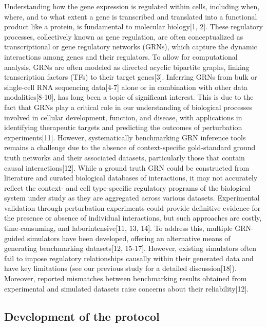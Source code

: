 Understanding how the gene expression is regulated within cells, including when, where, and to what extent a gene is transcribed and translated into a functional product like a protein, is fundamental to molecular biology[1, 2]. These regulatory processes, collectively known as gene regulation, are often conceptualized as transcriptional or gene regulatory networks (GRNs),
which capture the dynamic interactions among genes and their regulators. To allow for computational analysis, GRNs are often modeled as directed acyclic bipartite graphs, linking transcription factors (TFs) to their target genes[3]. Inferring GRNs from bulk or single-cell RNA sequencing data[4-7] alone or in combination with other data modalities[8-10], has long been a topic of significant interest. This is due to the fact that GRNs play a critical role in our understanding of biological processes involved in cellular development, function, and disease, with applications in identifying therapeutic targets and predicting the outcomes of perturbation experiments[11]. However, systematically benchmarking GRN inference tools remains a challenge due to the absence of context-specific gold-standard ground truth networks and their associated datasets, particularly those that contain causal interactions[12]. While a ground truth GRN could be constructed from literature and curated biological databases of interactions, it may not accurately reflect the context- and cell type-specific regulatory programs of the biological system under study as they are aggregated across various datasets. Experimental validation through perturbation experiments could provide definitive evidence for the presence or absence of individual interactions, but such approaches are costly, time-consuming, and laborintensive[11, 13, 14]. To address this, multiple GRN-guided simulators have been developed, offering an alternative means of generating benchmarking datasets[12, 15-17]. However, existing simulators often fail to impose regulatory relationships causally within their generated data and have key limitations (see our previous study for a detailed discussion[18]). Moreover, reported mismatches between benchmarking results obtained from experimental and simulated datasets raise concerns about their reliability[12].

\subsection*{Development of the protocol}

